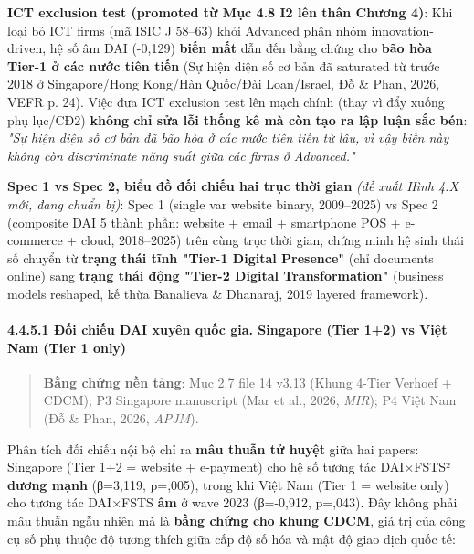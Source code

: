 \documentclass[12pt,a4paper]{article}
\begin{document}
\textbf{ICT exclusion test (promoted từ Mục 4.8 I2 lên thân Chương 4)}:
Khi loại bỏ ICT firms (mã ISIC J 58--63) khỏi Advanced phân nhóm
innovation-driven, hệ số âm DAI (-0,129) \textbf{biến mất} dẫn đến bằng
chứng cho \textbf{bão hòa Tier-1 ở các nước tiên tiến} (Sự hiện diện số
cơ bản đã saturated từ trước 2018 ở Singapore/Hong Kong/Hàn Quốc/Đài
Loan/Israel, Đỗ \& Phan, 2026, VEFR p. 24). Việc đưa ICT exclusion test
lên mạch chính (thay vì đẩy xuống phụ lục/CĐ2) \textbf{không chỉ sửa lỗi
thống kê mà còn tạo ra lập luận sắc bén}: \emph{"Sự hiện diện số cơ bản
đã bão hòa ở các nước tiên tiến từ lâu, vì vậy biến này không còn
discriminate năng suất giữa các firms ở Advanced."}

\textbf{Spec 1 vs Spec 2, biểu đồ đối chiếu hai trục thời gian}
\emph{(đề xuất Hình 4.X mới, đang chuẩn bị)}: Spec 1 (single var website
binary, 2009--2025) vs Spec 2 (composite DAI 5 thành phần: website +
email + smartphone POS + e-commerce + cloud, 2018--2025) trên cùng trục
thời gian, chứng minh hệ sinh thái số chuyển từ \textbf{trạng thái tĩnh
"Tier-1 Digital Presence"} (chỉ documents online) sang \textbf{trạng
thái động "Tier-2 Digital Transformation"} (business models reshaped, kế
thừa Banalieva \& Dhanaraj, 2019 layered framework).

\hypertarget{4451-ux111ux1ed1i-chiux1ebfu-dai-xuyuxean-quux1ed1c-gia-singapore-tier-12-vs-viux1ec7t-nam-tier-1-only}{%
\paragraph{4.4.5.1 Đối chiếu DAI xuyên quốc gia. Singapore (Tier 1+2) vs
Việt Nam (Tier 1
only)}\label{4451-ux111ux1ed1i-chiux1ebfu-dai-xuyuxean-quux1ed1c-gia-singapore-tier-12-vs-viux1ec7t-nam-tier-1-only}}

\begin{quote}
\textbf{Bằng chứng nền tảng}: Mục 2.7 file 14 v3.13 (Khung 4-Tier
Verhoef + CDCM); P3 Singapore manuscript (Mar et al., 2026, \emph{MIR});
P4 Việt Nam (Đỗ \& Phan, 2026, \emph{APJM}).
\end{quote}

Phân tích đối chiếu nội bộ chỉ ra \textbf{mâu thuẫn tử huyệt} giữa hai
papers: Singapore (Tier 1+2 = website + e-payment) cho hệ số tương tác
DAI×FSTS² \textbf{dương mạnh} (β=3,119, p=,005), trong khi Việt Nam
(Tier 1 = website only) cho tương tác DAI×FSTS \textbf{âm} ở wave 2023
(β=-0,912, p=,043). Đây không phải mâu thuẫn ngẫu nhiên mà là
\textbf{bằng chứng cho khung CDCM}, giá trị của công cụ số phụ thuộc độ
tương thích giữa cấp độ số hóa và mật độ giao dịch quốc tế:
\end{document}
